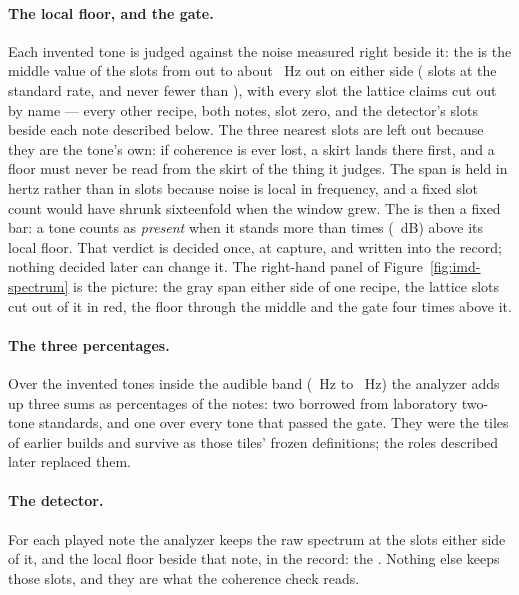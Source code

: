 \documentclass[11pt,a4paper]{article}
\begin{document}
\paragraph{The local floor, and the gate.} Each invented tone is judged
against the noise measured right beside it: the  is the
middle value of the slots from \imdLocalFloorInnerBins{} out to about
\imdLocalFloorSpanHz{}~Hz out on either side (\imdLocalFloorOuterBins{}
slots at the standard rate, and never fewer than
\imdLocalFloorMinimumOffsets{}), with every slot the lattice claims cut
out by name --- every other recipe, both notes, slot zero, and the
detector's slots beside each note described below. The three nearest
slots are left out because they are the tone's own: if coherence is ever
lost, a skirt lands there first, and a floor must never be read from the
skirt of the thing it judges. The span is held in hertz rather than in
slots because noise is local in frequency, and a fixed slot count would
have shrunk sixteenfold when the window grew. The  is then a
fixed bar: a tone counts as \emph{present} when it stands more than
\imdGateFactor{} times (\imdGateDB{}~dB) above its local floor. That
verdict is decided once, at capture, and written into the record;
nothing decided later can change it. The right-hand panel of
Figure~\ref{fig:imd-spectrum} is the picture: the gray span either side
of one recipe, the lattice slots cut out of it in red, the floor through
the middle and the gate four times above it.

\paragraph{The three percentages.} Over the invented tones inside the
audible band (\imdAudibleLowHz{}~Hz to \imdAudibleHighHz{}~Hz) the
analyzer adds up three sums as percentages of the notes: two borrowed
from laboratory two-tone standards, and one over every tone that passed
the gate. They were the tiles of earlier builds and survive as those
tiles' frozen definitions; the roles described later replaced them.

\paragraph{The detector.} For each played note the analyzer keeps the raw
spectrum at the \imdDetectorMaxOffset{} slots either side of it, and the
local floor beside that note, in the record: the .
Nothing else keeps those slots, and they are what the coherence check
reads.
\end{document}
